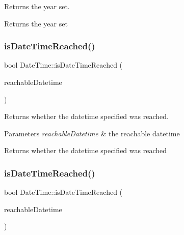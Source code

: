 Returns the year set. 

\begin{DoxyReturn}{Returns}
the year set 
\end{DoxyReturn}
\mbox{\label{class_date_time_a14a0e5a9af8caf8ab46bebd6e101daf0}} 
\subsubsection{\texorpdfstring{isDateTimeReached()}{isDateTimeReached()}\hspace{0.1cm}{\footnotesize\ttfamily [1/3]}}
{\footnotesize\ttfamily bool Date\+Time\+::is\+Date\+Time\+Reached (\begin{DoxyParamCaption}\item[{const \mbox{\hyperlink{class_date_time}{Date\+Time}} \&}]{reachable\+Datetime }\end{DoxyParamCaption})\hspace{0.3cm}{\ttfamily [static]}}



Returns whether the datetime specified was reached. 


\begin{DoxyParams}{Parameters}
{\em reachable\+Datetime} & the reachable datetime \\
\hline
\end{DoxyParams}
\begin{DoxyReturn}{Returns}
whether the datetime specified was reached 
\end{DoxyReturn}
\mbox{\label{class_date_time_aa9793671179a12cd08dc371a2668a321}} 
\subsubsection{\texorpdfstring{isDateTimeReached()}{isDateTimeReached()}\hspace{0.1cm}{\footnotesize\ttfamily [2/3]}}
{\footnotesize\ttfamily bool Date\+Time\+::is\+Date\+Time\+Reached (\begin{DoxyParamCaption}\item[{const \mbox{\hyperlink{class_a_string}{A\+String}} \&}]{reachable\+Datetime }\end{DoxyParamCaption})\hspace{0.3cm}{\ttfamily [static]}}



